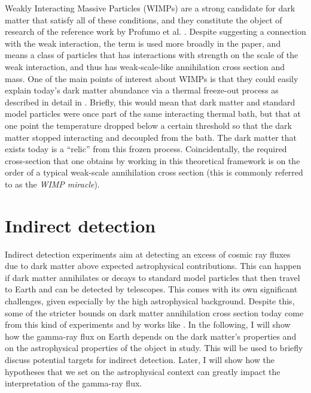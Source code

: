 Weakly Interacting Massive Particles (WIMPs) are a strong candidate for dark matter that satisfy all of these conditions, and they constitute the object of research of the reference work by Profumo et al. \cite{Profumo_2018}. Despite suggesting a connection with the weak interaction, the term is used more broadly in the paper, and means a class of particles that has interactions with strength on the scale of the weak interaction, and thus has weak-scale-like annihilation cross section and mass. One of the main points of interest about WIMPs is that they could easily explain today's dark matter abundance via a thermal freeze-out process as described in detail in \cite[Chapter 4]{Cirelli_2024}. Briefly, this would mean that dark matter and standard model particles were once part of the same interacting thermal bath, but that at one point the temperature dropped below a certain threshold so that the dark matter stopped interacting and decoupled from the bath. The dark matter that exists today is a ``relic'' from this frozen process. Coincidentally, the required cross-section that one obtains by working in this theoretical framework is on the order of a typical weak-scale annihilation cross section (this is commonly referred to as the \emph{WIMP miracle}).

\section{Indirect detection}\label{sec:indirect_detection}
Indirect detection experiments aim at detecting an excess of cosmic ray fluxes due to dark matter above expected astrophysical contributions. This can happen if dark matter annihilates or decays to standard model particles that then travel to Earth and can be detected by telescopes. This comes with its own significant challenges, given especially by the high astrophysical background. Despite this, some of the stricter bounds on dark matter annihilation cross section today \cite{Hooper_2018} come from this kind of experiments and by works like \cite{Profumo_2018}. In the following, I will show how the gamma-ray flux on Earth depends on the dark matter's properties and on the astrophysical properties of the object in study. This will be used to briefly discuss potential targets for indirect detection. Later, I will show how the hypotheses that we set on the astrophysical context can greatly impact the interpretation of the gamma-ray flux.

